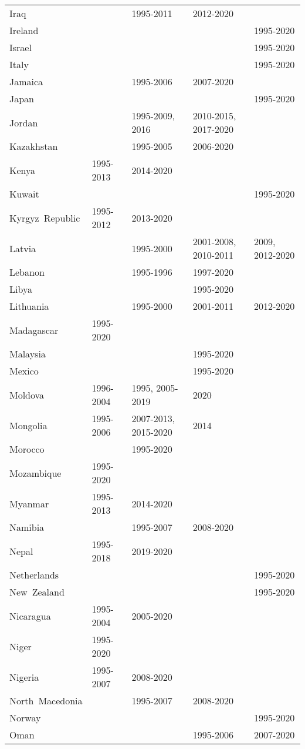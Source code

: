 \begin{appendices}
\begin{table}[H]
\begin{adjustbox}{width=\textwidth,center}
\begin{tabular}{|l|llll|}
	Iraq &  & 1995-2011 & 2012-2020 &  \\
	Ireland &  &  &  & 1995-2020 \\
	Israel &  &  &  & 1995-2020 \\
	Italy &  &  &  & 1995-2020 \\
	Jamaica &  & 1995-2006 & 2007-2020 &  \\
	Japan &  &  &  & 1995-2020 \\
	Jordan &  & 1995-2009, 2016 & 2010-2015, 2017-2020 &  \\
	Kazakhstan &  & 1995-2005 & 2006-2020 &  \\
	Kenya & 1995-2013 & 2014-2020 &  &  \\
	Kuwait &  &  &  & 1995-2020 \\
	Kyrgyz\ Republic & 1995-2012 & 2013-2020 &  &  \\
	Latvia &  & 1995-2000 & 2001-2008, 2010-2011 & 2009, 2012-2020 \\
	Lebanon &  & 1995-1996 & 1997-2020 &  \\
	Libya &  &  & 1995-2020 &  \\
	Lithuania &  & 1995-2000 & 2001-2011 & 2012-2020 \\
	Madagascar & 1995-2020 &  &  &  \\
	Malaysia &  &  & 1995-2020 &  \\
	Mexico &  &  & 1995-2020 &  \\
	Moldova & 1996-2004 & 1995, 2005-2019 & 2020 &  \\
	Mongolia & 1995-2006 & 2007-2013, 2015-2020 & 2014 &  \\
	Morocco &  & 1995-2020 &  &  \\
	Mozambique & 1995-2020 &  &  &  \\
	Myanmar & 1995-2013 & 2014-2020 &  &  \\
	Namibia &  & 1995-2007 & 2008-2020 &  \\
	Nepal & 1995-2018 & 2019-2020 &  &  \\
	Netherlands &  &  &  & 1995-2020 \\
	New\ Zealand &  &  &  & 1995-2020 \\
	Nicaragua & 1995-2004 & 2005-2020 &  &  \\
	Niger & 1995-2020 &  &  &  \\
	Nigeria & 1995-2007 & 2008-2020 &  &  \\
	North\ Macedonia &  & 1995-2007 & 2008-2020 &  \\
	Norway &  &  &  & 1995-2020 \\
	Oman &  &  & 1995-2006 & 2007-2020 \\

\end{tabular}
\end{adjustbox}
\end{table}
\end{appendices}
